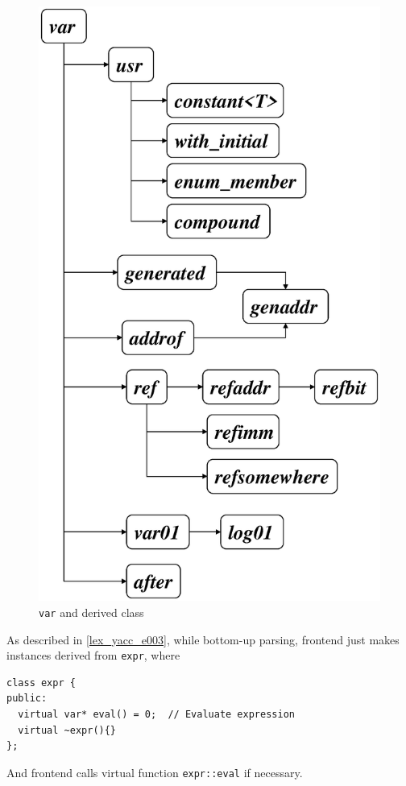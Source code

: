 \begin{figure}[htbp]
\begin{center}
\begin{htmlonly}
\end{htmlonly} 
\begin{latexonly}
\includegraphics[width=1.0\linewidth,height=1.626\linewidth]{var.eps}
\end{latexonly}
\caption{{\tt{var}} and derived class}
\label{expr_e013}
\end{center}
\end{figure}

As described in \ref{lex_yacc_e003}, 
while bottom-up parsing, frontend just makes instances
derived from {\tt{expr}}, where
\begin{verbatim}
class expr {
public:
  virtual var* eval() = 0;  // Evaluate expression
  virtual ~expr(){}
};
\end{verbatim}
And frontend calls virtual function {\tt{expr::eval}} if necessary.

